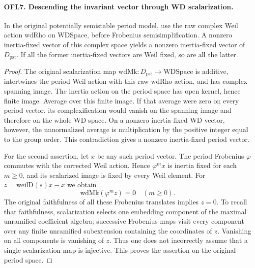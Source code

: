 \paragraph{OFL7. Descending the invariant vector through WD scalarization.}
\label{claim:OFL7}
In the original potentially semistable period model, use the raw
complex Weil action \(\mathrm{wdRho}\) on \(\mathrm{WDSpace}\),
before Frobenius semisimplification.  A nonzero
inertia-fixed vector of this complex space yields a nonzero
inertia-fixed vector of \(D_{\mathrm{pst}}\).  If all the former
inertia-fixed vectors are Weil fixed, so are all the latter.
\begin{proof}
The original scalarization map \(\mathrm{wdMk}:D_{\mathrm{pst}}
\to\mathrm{WDSpace}\) is additive, intertwines the period Weil
action with this raw \(\mathrm{wdRho}\) action,
and has complex spanning image.  The inertia action on the period
space has open kernel, hence finite image.  Average over this finite
image.  If that average were zero on every period vector, its
complexification would vanish on the spanning image and therefore
on the whole WD space.  On a nonzero inertia-fixed WD vector,
however, the unnormalized average is multiplication by the positive
integer equal to the group order.  This contradiction gives a
nonzero inertia-fixed period vector.

For the second assertion, let \(x\) be any such period vector.
The period Frobenius \(\varphi\) commutes with the corrected
Weil action.  Hence \(\varphi^m x\) is inertia fixed for each
\(m\ge0\), and its scalarized image is fixed by every Weil
element.  For \(z=\mathrm{weilD}(s)x-x\) we obtain
\[
             \mathrm{wdMk}(\varphi^m z)=0\quad(m\ge0).
 \tag{OFL.8}
\]
The original faithfulness of all these Frobenius translates implies
\(z=0\).  To recall that faithfulness, scalarization selects one
embedding component of the maximal unramified coefficient algebra;
successive Frobenius maps visit every component over any finite
unramified subextension containing the coordinates of \(z\).
Vanishing on all components is vanishing of \(z\).  Thus one
does not incorrectly assume that a single scalarization map is
injective.  This proves the assertion on the original period space.
\end{proof}

